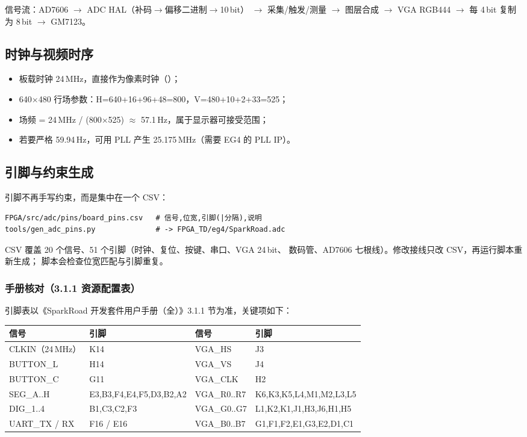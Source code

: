 信号流：AD7606 $\rightarrow$ ADC HAL（补码$\rightarrow$偏移二进制$\rightarrow$10\,bit）
$\rightarrow$ 采集/触发/测量 $\rightarrow$ 图层合成 $\rightarrow$ VGA RGB444
$\rightarrow$ 每 4\,bit 复制为 8\,bit $\rightarrow$ GM7123。

\subsection{时钟与视频时序}

\begin{itemize}[leftmargin=2em,itemsep=2pt]
  \item 板载时钟 24\,MHz，直接作为像素时钟（）；
  \item 640$\times$480 行场参数：H=640+16+96+48=800，V=480+10+2+33=525；
  \item 场频 = 24\,MHz / (800$\times$525) $\approx$ 57.1\,Hz，属于显示器可接受范围；
  \item 若要严格 59.94\,Hz，可用 PLL 产生 25.175\,MHz（需要 EG4 的 PLL IP）。
\end{itemize}

\subsection{引脚与约束生成}

引脚不再手写约束，而是集中在一个 CSV：

\begin{lstlisting}[style=vsnip]
FPGA/src/adc/pins/board_pins.csv   # 信号,位宽,引脚(|分隔),说明
tools/gen_adc_pins.py              # -> FPGA_TD/eg4/SparkRoad.adc
\end{lstlisting}

CSV 覆盖 20 个信号、51 个引脚（时钟、复位、按键、串口、VGA 24\,bit、
数码管、AD7606 七根线）。修改接线只改 CSV，再运行脚本重新生成；
脚本会检查位宽匹配与引脚重复。

\subsubsection{手册核对（3.1.1 资源配置表）}

引脚表以《SparkRoad 开发套件用户手册（全）》3.1.1 节为准，关键项如下：

\begin{center}
\small
\begin{tabular}{llll}
\toprule
信号 & 引脚 & 信号 & 引脚\\
\midrule
CLKIN（24\,MHz） & K14 & VGA\_HS & J3\\
BUTTON\_L & H14 & VGA\_VS & J4\\
BUTTON\_C & G11 & VGA\_CLK & H2\\
SEG\_A..H & E3,B3,F4,E4,F5,D3,B2,A2 & VGA\_R0..R7 & K6,K3,K5,L4,M1,M2,L3,L5\\
DIG\_1..4 & B1,C3,C2,F3 & VGA\_G0..G7 & L1,K2,K1,J1,H3,J6,H1,H5\\
UART\_TX / RX & F16 / E16 & VGA\_B0..B7 & G1,F1,F2,E1,G3,E2,D1,C1\\
\bottomrule
\end{tabular}
\end{center}

